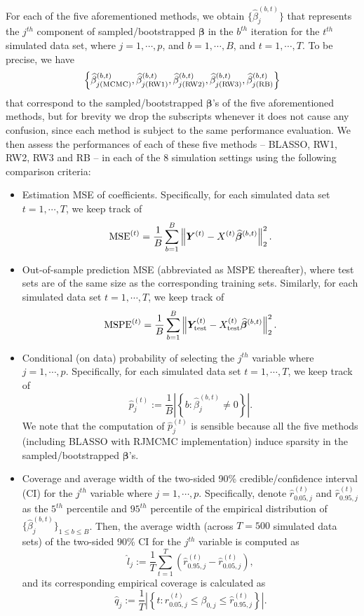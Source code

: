 \documentclass[ejs,authoryear,linksfromyear]{imsart}
\numberwithin{equation}{section}
\theoremstyle{plain}
\begin{document}
For each of the five aforementioned methods, we obtain $\{ \widehat{\beta}_j^{(b,t)} \}$ that represents the $j^{th}$ component of sampled/bootstrapped $\bm{\beta}$ in the $b^{th}$ iteration for the $t^{th}$ simulated data set, where $j = 1, \cdots, p$, and $b = 1, \cdots, B$, and $t = 1, \cdots, T$. To be precise, we have 
$$
\left\{
\widehat{\beta}_{j (\rm MCMC)}^{(b,t)}, 
\widehat{\beta}_{j (\rm RW1)}^{(b,t)}, 
\widehat{\beta}_{j (\rm RW2)}^{(b,t)}, 
\widehat{\beta}_{j (\rm RW3)}^{(b,t)}, 
\widehat{\beta}_{j (\rm RB)}^{(b,t)}
\right\}
$$
that correspond to the sampled/bootstrapped $\bm{\beta}$'s of the five aforementioned methods, but for brevity we drop the subscripts whenever it does not cause any confusion, since each method is subject to the same performance evaluation. We then assess the performances of each of these five methods -- BLASSO, RW1, RW2, RW3 and RB -- in each of the 8 simulation settings using the following comparison criteria:
\begin{itemize}
	\item Estimation MSE of coefficients. Specifically, for each simulated data set $t = 1, \cdots, T$, we keep track of 
	$$
	{\rm MSE}^{(t)} = \dfrac{1}{B} \sum_{b=1}^B 
	\left\Vert
	\bm{Y}^{(t)} - X^{(t)} \widehat{\bm{\beta}}^{(b,t)}
	\right\Vert_2^2.
	$$
	\item Out-of-sample prediction MSE (abbreviated as MSPE thereafter), where test sets are of the same size as the corresponding training sets. Similarly, for each simulated data set $t = 1, \cdots, T$, we keep track of 
	$$
	{\rm MSPE}^{(t)} = \dfrac{1}{B} \sum_{b=1}^B 
	\left\Vert
	\bm{Y}^{(t)}_{\rm test} - X^{(t)}_{\rm test} \widehat{\bm{\beta}}^{(b,t)}
	\right\Vert_2^2.
	$$ 
	\item Conditional (on data) probability of selecting the $j^{th}$ variable where $j = 1, \cdots, p$. Specifically, for each simulated data set $t = 1, \cdots, T$, we keep track of 
	$$
	\hat{p}_j^{(t)} :=  \dfrac{1}{B}
	\left\vert
	\left\{
	b: \widehat{\beta}_j^{(b,t)} \neq 0
	\right\}
	\right\vert.
	$$ 
	We note that the computation of $\hat{p}_j^{(t)}$ is sensible because all the five methods (including BLASSO with RJMCMC implementation) induce sparsity in the sampled/bootstrapped $\bm{\beta}$'s.
	\item Coverage and average width of the two-sided 90\% credible/confidence interval (CI) for the $j^{th}$ variable  where $j = 1, \cdots, p$. Specifically, denote $\hat{r}_{0.05,j}^{(t)}$ and $\hat{r}_{0.95,j}^{(t)}$ as the $5^{th}$ percentile and $95^{th}$ percentile of the empirical distribution of $\{ \widehat{\beta}_j^{(b,t)} \}_{1 \leq b \leq B}$. Then, the average width (across $T=500$ simulated data sets) of the two-sided 90\% CI for the $j^{th}$ variable is computed as
	$$
	\hat{l}_j :=
	\dfrac{1}{T} \sum_{t=1}^T 
	\left(
	\hat{r}_{0.95,j}^{(t)} - \hat{r}_{0.05,j}^{(t)}
	\right),
	$$
	and its corresponding empirical coverage is calculated as
	$$
	\hat{q}_j :=
	\dfrac{1}{T} %
	\left\vert
	\left\{
	t: \hat{r}_{0.05,j}^{(t)} 
	\leq \beta_{0,j} \leq
	\hat{r}_{0.95,j}^{(t)}
	\right\}
	\right\vert.
	$$
\end{itemize}  
\end{document}
